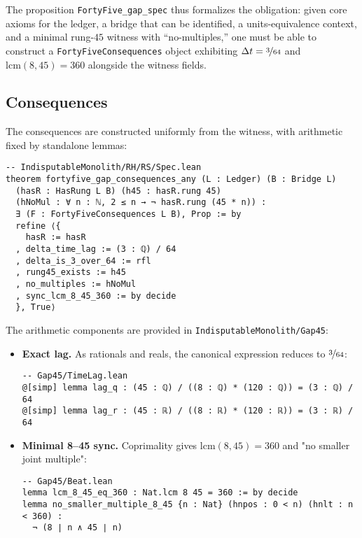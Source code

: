 \documentclass[11pt,a4paper,twoside]{article}
\numberwithin{equation}{section}
\theoremstyle{customthm}
\theoremstyle{customdef}
\theoremstyle{customrem}
\begin{document}
The proposition \texttt{FortyFive\_gap\_spec} thus formalizes the obligation: given core axioms for the ledger, a bridge that can be identified, a units-equivalence context, and a minimal rung-$45$ witness with ``no-multiples,'' one must be able to construct a \texttt{FortyFiveConsequences} object exhibiting $\Delta t=\nicefrac{3}{64}$ and $\mathrm{lcm}(8,45)=360$ alongside the witness fields.

\subsection{Consequences}\label{subsec:gap45-consequences}

The consequences are constructed uniformly from the witness, with arithmetic fixed by standalone lemmas:

\begin{lstlisting}
-- IndisputableMonolith/RH/RS/Spec.lean
theorem fortyfive_gap_consequences_any (L : Ledger) (B : Bridge L)
  (hasR : HasRung L B) (h45 : hasR.rung 45)
  (hNoMul : ∀ n : ℕ, 2 ≤ n → ¬ hasR.rung (45 * n)) :
  ∃ (F : FortyFiveConsequences L B), Prop := by
  refine ⟨{
    hasR := hasR
  , delta_time_lag := (3 : ℚ) / 64
  , delta_is_3_over_64 := rfl
  , rung45_exists := h45
  , no_multiples := hNoMul
  , sync_lcm_8_45_360 := by decide
  }, True⟩
\end{lstlisting}

The arithmetic components are provided in \texttt{IndisputableMonolith/Gap45}:
\begin{itemize}[leftmargin=*]
  \item \textbf{Exact lag.} As rationals and reals, the canonical expression reduces to $\nicefrac{3}{64}$:
\begin{lstlisting}
-- Gap45/TimeLag.lean
@[simp] lemma lag_q : (45 : ℚ) / ((8 : ℚ) * (120 : ℚ)) = (3 : ℚ) / 64
@[simp] lemma lag_r : (45 : ℝ) / ((8 : ℝ) * (120 : ℝ)) = (3 : ℝ) / 64
\end{lstlisting}
  \item \textbf{Minimal 8–45 sync.} Coprimality gives $\mathrm{lcm}(8,45)=360$ and "no smaller joint multiple":
\begin{lstlisting}
-- Gap45/Beat.lean
lemma lcm_8_45_eq_360 : Nat.lcm 8 45 = 360 := by decide
lemma no_smaller_multiple_8_45 {n : Nat} (hnpos : 0 < n) (hnlt : n < 360) :
  ¬ (8 ∣ n ∧ 45 ∣ n)
\end{lstlisting}
\end{itemize}
\end{document}

